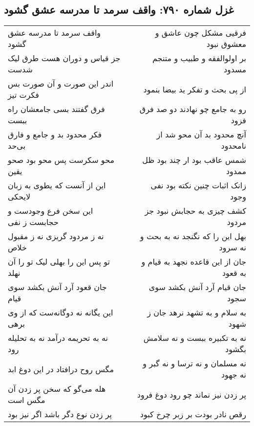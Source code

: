 \begin{center}
\section*{غزل شماره ۷۹۰: واقف سرمد تا مدرسه عشق گشود}
\label{sec:0790}
\begin{longtable}{l p{0.5cm} r}
واقف سرمد تا مدرسه عشق گشود
&&
فرقیی مشکل چون عاشق و معشوق نبود
\\
جز قیاس و دوران هست طرق لیک شدست
&&
بر اولوالفقه و طبیب و متنجم مسدود
\\
اندر این صورت و آن صورت بس فکرت تیز
&&
از پی بحث و تفکر ید بیضا بنمود
\\
فرق گفتند بسی جامعشان راه ببست
&&
رو به جامع چو نهادند دو صد فرق فزود
\\
فکر محدود بد و جامع و فارق بی‌حد
&&
آنچ محدود بد آن محو شد از نامحدود
\\
محو سکرست پس محو بود صحو یقین
&&
شمس عاقب بود ار چند بود ظل ممدود
\\
این از آنست که یطوی به زبان لایحکی
&&
زانک اثبات چنین نکته بود نفی وجود
\\
این سخن فرع وجودست و حجابست ز نفی
&&
کشف چیزی به حجابش نبود جز مردود
\\
نه ز مردود گریزی نه ز مقبول خلاص
&&
بهل این را که نگنجد نه به بحث و نه سرود
\\
تو پس این را بهلی لیک تو را آن نهلد
&&
جان از این قاعده نجهد به قیام و به قعود
\\
جان قعود آرد آنش بکشد سوی قیام
&&
جان قیام آرد آنش بکشد سوی سجود
\\
این یگانه نه دوگانه‌ست که از وی برهی
&&
به سلام و به تشهد نرهد جان ز شهود
\\
نه به تحریمه درآمد نه به تحلیله رود
&&
نه به تکبیره ببست و نه سلامش بگشود
\\
مگس روح درافتاد در این دوغ ابد
&&
نه مسلمان و نه ترسا و نه گبر و نه جهود
\\
هله می‌گو که سخن پر زدن آن مگس است
&&
پر زدن نیز نماند چو رود دوغ فرود
\\
پر زدن نوع دگر باشد اگر نیز بود
&&
رقص نادر بودت بر زبر چرخ کبود
\\
\end{longtable}
\end{center}
